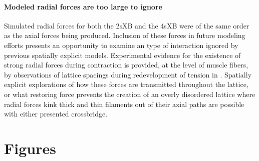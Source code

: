 \documentclass[]{article}
\begin{document}
\paragraph{Modeled radial forces are too large to ignore} %
Simulated radial forces for both the 2sXB and the 4sXB were of the same order as the axial forces being produced. 
Inclusion of these forces in future modeling efforts presents an opportunity to examine an type of interaction ignored by previous spatially explicit models.
Experimental evidence for the existence of strong radial forces during contraction is provided, at the level of muscle fibers, by observations of lattice spacings during redevelopment of tension in \citet{Cecchi:1990p2763}.
Spatially explicit explorations of how these forces are transmitted throughout the lattice, or what restoring force prevents the creation of an overly disordered lattice where radial forces kink thick and thin filaments out of their axial paths are possible with either presented crossbridge.




\clearpage
\section*{Figures} %
\end{document}
